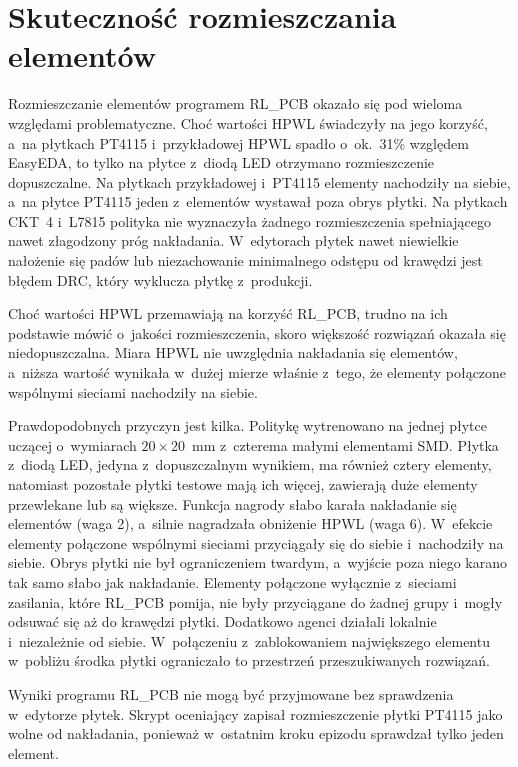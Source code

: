 \section{Skuteczność rozmieszczania elementów}

Rozmieszczanie elementów programem RL\_PCB okazało się pod wieloma
względami problematyczne. Choć wartości HPWL świadczyły na jego
korzyść, a~na płytkach PT4115 i~przykładowej HPWL spadło o~ok.~31\%
względem EasyEDA, to tylko na płytce z~diodą LED otrzymano
rozmieszczenie dopuszczalne. Na płytkach przykładowej i~PT4115 elementy
nachodziły na siebie, a~na płytce PT4115 jeden z~elementów wystawał
poza obrys płytki. Na płytkach CKT~4 i~L7815 polityka nie wyznaczyła
żadnego rozmieszczenia spełniającego nawet złagodzony próg nakładania.
W~edytorach płytek nawet niewielkie nałożenie się padów lub
niezachowanie minimalnego odstępu od krawędzi jest błędem DRC, który
wyklucza płytkę z~produkcji.

Choć wartości HPWL przemawiają na korzyść RL\_PCB, trudno na ich
podstawie mówić o~jakości rozmieszczenia, skoro większość rozwiązań
okazała się niedopuszczalna. Miara HPWL nie uwzględnia nakładania się
elementów, a~niższa wartość wynikała w~dużej mierze właśnie z~tego, że
elementy połączone wspólnymi sieciami nachodziły na siebie.

Prawdopodobnych przyczyn jest kilka. Politykę wytrenowano na jednej
płytce uczącej o~wymiarach $20 \times 20$~mm z~czterema małymi
elementami SMD. Płytka z~diodą LED, jedyna z~dopuszczalnym wynikiem, ma
również cztery elementy, natomiast pozostałe płytki testowe mają ich
więcej, zawierają duże elementy przewlekane lub są większe. Funkcja
nagrody słabo karała nakładanie się elementów (waga 2), a~silnie
nagradzała obniżenie HPWL (waga 6). W~efekcie elementy połączone
wspólnymi sieciami przyciągały się do siebie i~nachodziły na siebie.
Obrys płytki nie był ograniczeniem twardym, a~wyjście poza niego karano
tak samo słabo jak nakładanie. Elementy połączone wyłącznie z~sieciami
zasilania, które RL\_PCB pomija, nie były przyciągane do żadnej grupy
i~mogły odsuwać się aż do krawędzi płytki. Dodatkowo agenci działali
lokalnie i~niezależnie od siebie. W~połączeniu z~zablokowaniem
największego elementu w~pobliżu środka płytki ograniczało to przestrzeń
przeszukiwanych rozwiązań.

Wyniki programu RL\_PCB nie mogą być przyjmowane bez sprawdzenia
w~edytorze płytek. Skrypt oceniający zapisał rozmieszczenie płytki
PT4115 jako wolne od nakładania, ponieważ w~ostatnim kroku epizodu
sprawdzał tylko jeden element.

